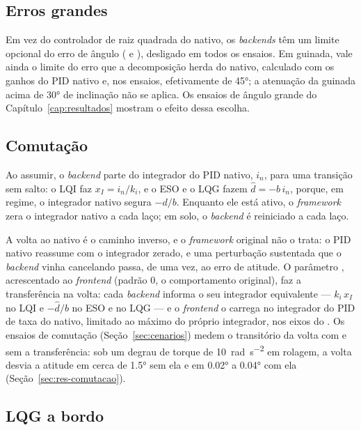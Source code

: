 \subsection{Erros grandes}

Em vez do controlador de raiz quadrada do nativo,
os \textit{backends} têm um limite opcional do erro de ângulo
( e ), desligado em todos os
ensaios. Em guinada, vale ainda o limite do erro que a decomposição herda do
nativo, calculado com os ganhos do PID nativo e, nos ensaios, efetivamente
de \ang{45}; a atenuação da guinada acima de \ang{30} de inclinação não se
aplica. Os ensaios de ângulo grande do Capítulo~\ref{cap:resultados} mostram
o efeito dessa escolha.

\subsection{Comutação}

Ao assumir, o \textit{backend} parte do integrador do
PID nativo, $i_n$, para uma transição sem salto: o LQI faz
$x_I = i_n/k_i$, e o ESO e o LQG fazem $\hat d = -b\,i_n$, porque, em regime,
o integrador nativo segura $-d/b$. Enquanto ele está ativo, o
\textit{framework} zera o integrador nativo a cada laço; em solo, o
\textit{backend} é reiniciado a cada laço.

A volta ao nativo é o caminho inverso, e o \textit{framework} original não o
trata: o PID nativo reassume com o integrador zerado, e uma perturbação
sustentada que o \textit{backend} vinha cancelando passa, de uma vez, ao
erro de atitude. O parâmetro , acrescentado ao
\textit{frontend} (padrão 0, o comportamento original), faz a transferência
na volta: cada \textit{backend} informa o seu integrador equivalente ---
$k_i\,x_I$ no LQI e $-\hat d/b$ no ESO e no LQG --- e o \textit{frontend} o
carrega no integrador do PID de taxa do nativo, limitado ao máximo do
próprio integrador, nos eixos do . Os ensaios de
comutação (Seção~\ref{sec:cenarios}) medem o transitório da volta com e sem
a transferência: sob um degrau de torque de
\SI{10}{\radian\per\second\squared} em rolagem, a volta desvia a atitude em
cerca de \ang{1.5} sem ela e em \ang{0.02} a \ang{0.04} com ela
(Seção~\ref{sec:res-comutacao}).

\subsection{LQG a bordo}

